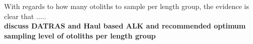 \documentclass[a4paper 12pt]{article}
\numberwithin{equation}{section}
\begin{document}


With regards to how many otoliths to sample per length group, the evidence is clear that .....\\

{\bf discuss DATRAS and Haul based ALK and recommended optimum sampling level of otoliths per length group}


%
\end{document}

